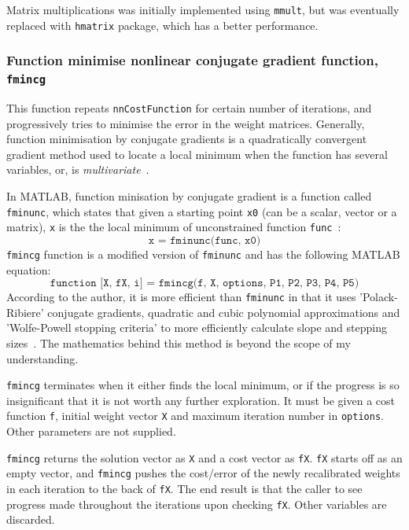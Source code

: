 Matrix multiplications was initially implemented using \texttt{mmult}, but was eventually replaced with \texttt{hmatrix} package, which has a better performance. 

\subsubsection{Function minimise nonlinear conjugate gradient function, \texttt{fmincg}} \label{se:impl.fmincg}

This function repeats \texttt{nnCostFunction} for certain number of iterations, and progressively tries to minimise the error in the weight matrices. Generally, function minimisation by conjugate gradients is a quadratically convergent gradient method used to locate a local minimum when the function has several variables, or, is \textit{multivariate}~\cite{FleRee}.

In MATLAB, function minisation by conjugate gradient is a function called \texttt{fminunc}, which states that given a starting point \texttt{x0} (can be a scalar, vector or a matrix), \texttt{x} is the the local minimum of unconstrained function \texttt{func}~\cite{Mat17}:
$$\texttt{x = fminunc(func, x0)}$$
\texttt{fmincg} function is a modified version of \texttt{fminunc} and has the following MATLAB equation:
$$\texttt{function [X, fX, i] = fmincg(f, X, options, P1, P2, P3, P4, P5)}$$
According to the author, it is more efficient than \texttt{fminunc} in that it uses 'Polack-Ribiere' conjugate gradients, quadratic and cubic polynomial approximations and 'Wolfe-Powell stopping criteria' to more efficiently calculate slope and stepping sizes~\cite{Reb13}. The mathematics behind this method is beyond the scope of my understanding.

\texttt{fmincg} terminates when it either finds the local minimum, or if the progress is so insignificant that it is not worth any further exploration. It must be given a cost function \texttt{f}, initial weight vector \texttt{X} and maximum iteration number in \texttt{options}. Other parameters are not supplied. 

\texttt{fmincg} returns the solution vector as \texttt{X} and a cost vector as \texttt{fX}. \texttt{fX} starts off as an empty vector, and \texttt{fmincg} pushes the cost/error of the newly recalibrated weights in each iteration to the back of \texttt{fX}. The end result is that the caller to see progress made throughout the iterations upon checking \texttt{fX}. Other variables are discarded.

